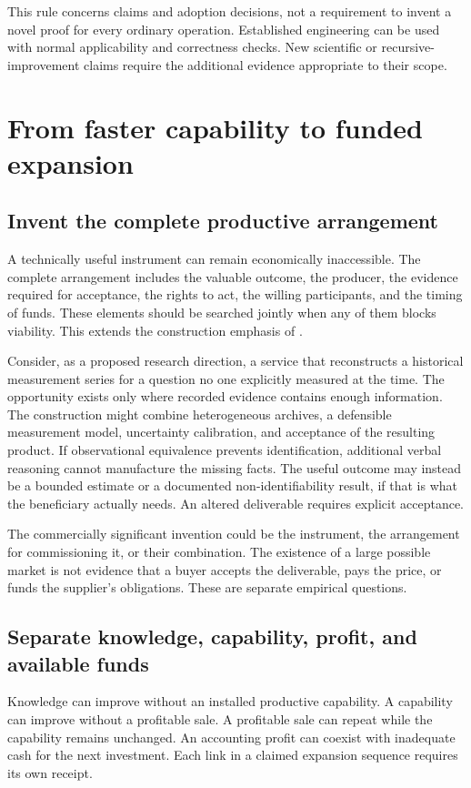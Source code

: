 \documentclass[11pt,letterpaper]{article}
\theoremstyle{remark}\newtheorem{remark}{Remark}[section]
\begin{document}
This rule concerns claims and adoption decisions, not a requirement to invent a novel proof for every ordinary operation.
Established engineering can be used with normal applicability and correctness checks.
New scientific or recursive-improvement claims require the additional evidence appropriate to their scope.

\section{From faster capability to funded expansion}\label{sec:economics}

\subsection{Invent the complete productive arrangement}
A technically useful instrument can remain economically inaccessible.
The complete arrangement includes the valuable outcome, the producer, the evidence required for acceptance, the rights to act, the willing participants, and the timing of funds.
These elements should be searched jointly when any of them blocks viability.
This extends the construction emphasis of \citet{boucher2026economy,boucher2026frontier}.

Consider, as a proposed research direction, a service that reconstructs a historical measurement series for a question no one explicitly measured at the time.
The opportunity exists only where recorded evidence contains enough information.
The construction might combine heterogeneous archives, a defensible measurement model, uncertainty calibration, and acceptance of the resulting product.
If observational equivalence prevents identification, additional verbal reasoning cannot manufacture the missing facts.
The useful outcome may instead be a bounded estimate or a documented non-identifiability result, if that is what the beneficiary actually needs.
An altered deliverable requires explicit acceptance.

The commercially significant invention could be the instrument, the arrangement for commissioning it, or their combination.
The existence of a large possible market is not evidence that a buyer accepts the deliverable, pays the price, or funds the supplier's obligations.
These are separate empirical questions.

\subsection{Separate knowledge, capability, profit, and available funds}
Knowledge can improve without an installed productive capability.
A capability can improve without a profitable sale.
A profitable sale can repeat while the capability remains unchanged.
An accounting profit can coexist with inadequate cash for the next investment.
Each link in a claimed expansion sequence requires its own receipt.
\end{document}
